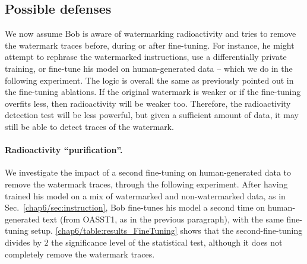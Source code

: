 \subsection{Possible defenses}

We now assume Bob is aware of watermarking radioactivity and tries to remove the watermark traces before, during or after fine-tuning.
For instance, he might attempt to rephrase the watermarked instructions, use a differentially private training, or fine-tune his model on human-generated data -- which we do in the following experiment.
The logic is overall the same as previously pointed out in the fine-tuning ablations.
If the original watermark is weaker or if the fine-tuning overfits less, then radioactivity will be weaker too.
Therefore, the radioactivity detection test will be less powerful, but given a sufficient amount of data, it may still be able to detect traces of the watermark.

\paragraph{Radioactivity ``purification''.}\label{chap6/ref:purification}
We investigate the impact of a second fine-tuning on human-generated data to remove the watermark traces, through the following experiment.
After having trained his model on a mix of watermarked and non-watermarked data, as in Sec.~\ref{chap6/sec:instruction}, Bob fine-tunes his model a second time on human-generated text (from OASST1, as in the previous paragraph), with the same fine-tuning setup.
\autoref{chap6/table:results_FineTuning} shows that the second-fine-tuning divides by $2$ the significance level of the statistical test, although it does not completely remove the watermark traces.

